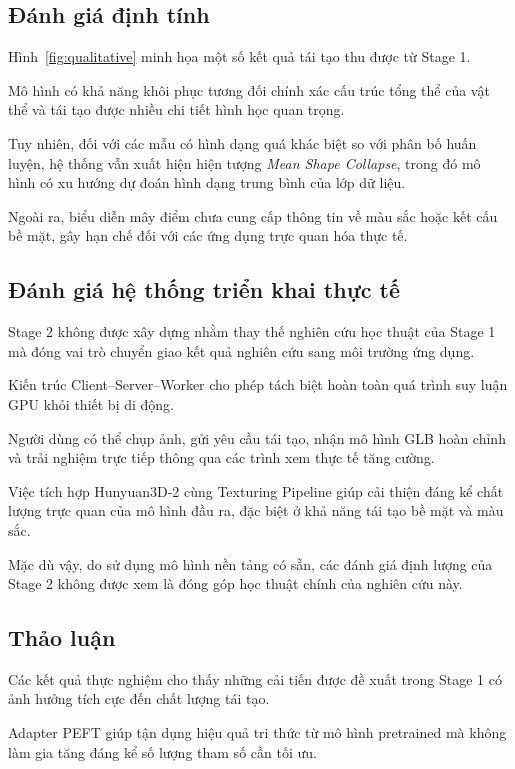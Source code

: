 \documentclass[conference,a4paper]{IEEEtran}
\begin{document}
\subsection{Đánh giá định tính}

Hình~\ref{fig:qualitative} minh họa một số kết quả tái tạo thu được từ Stage 1.

Mô hình có khả năng khôi phục tương đối chính xác cấu trúc tổng thể của vật thể và tái tạo được nhiều chi tiết hình học quan trọng.

Tuy nhiên, đối với các mẫu có hình dạng quá khác biệt so với phân bố huấn luyện, hệ thống vẫn xuất hiện hiện tượng \textit{Mean Shape Collapse}, trong đó mô hình có xu hướng dự đoán hình dạng trung bình của lớp dữ liệu.

Ngoài ra, biểu diễn mây điểm chưa cung cấp thông tin về màu sắc hoặc kết cấu bề mặt, gây hạn chế đối với các ứng dụng trực quan hóa thực tế.

\subsection{Đánh giá hệ thống triển khai thực tế}

Stage 2 không được xây dựng nhằm thay thế nghiên cứu học thuật của Stage 1 mà đóng vai trò chuyển giao kết quả nghiên cứu sang môi trường ứng dụng.

Kiến trúc Client--Server--Worker cho phép tách biệt hoàn toàn quá trình suy luận GPU khỏi thiết bị di động.

Người dùng có thể chụp ảnh, gửi yêu cầu tái tạo, nhận mô hình GLB hoàn chỉnh và trải nghiệm trực tiếp thông qua các trình xem thực tế tăng cường.

Việc tích hợp Hunyuan3D-2 cùng Texturing Pipeline giúp cải thiện đáng kể chất lượng trực quan của mô hình đầu ra, đặc biệt ở khả năng tái tạo bề mặt và màu sắc.

Mặc dù vậy, do sử dụng mô hình nền tảng có sẵn, các đánh giá định lượng của Stage 2 không được xem là đóng góp học thuật chính của nghiên cứu này.

\subsection{Thảo luận}

Các kết quả thực nghiệm cho thấy những cải tiến được đề xuất trong Stage 1 có ảnh hưởng tích cực đến chất lượng tái tạo.

Adapter PEFT giúp tận dụng hiệu quả tri thức từ mô hình pretrained mà không làm gia tăng đáng kể số lượng tham số cần tối ưu.
\end{document}
